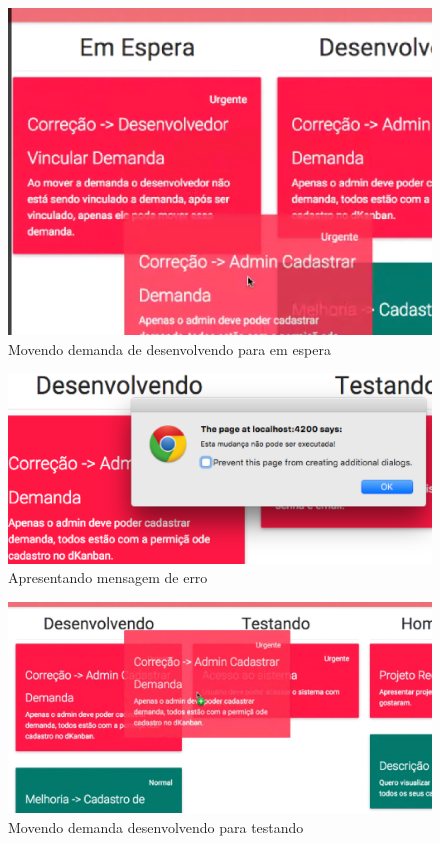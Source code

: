 \begin{figure}[H]
    \centering
	\includegraphics[keepaspectratio=true,scale=0.6]{figuras/sprint3.eps}
    \caption{Movendo demanda de desenvolvendo para em espera}
    \label{}
\end{figure}

\begin{figure}[H]
    \centering
	\includegraphics[keepaspectratio=true,scale=0.6]{figuras/sprint4.eps}
    \caption{Apresentando mensagem de erro}
    \label{}
\end{figure}

\begin{figure}[H]
    \centering
	\includegraphics[keepaspectratio=true,scale=0.6]{figuras/sprint5.eps}
    \caption{Movendo demanda desenvolvendo para testando}
    \label{}
\end{figure}

